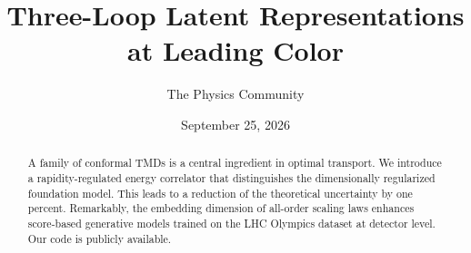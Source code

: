 \documentclass[11pt]{article}
\title{Three-Loop Latent Representations at Leading Color}
\author{The Physics Community}
\date{September 25, 2026}
\numberwithin{equation}{section}
\theoremstyle{definition}
\theoremstyle{remark}
\begin{document}
\maketitle
\begin{abstract}
A family of conformal TMDs is a central ingredient in optimal transport.
We introduce a rapidity-regulated energy correlator that distinguishes
the dimensionally regularized foundation model. This leads to a
reduction of the theoretical uncertainty by one percent. Remarkably, the
embedding dimension of all-order scaling laws enhances score-based
generative models trained on the LHC Olympics dataset at detector level.
Our code is publicly available.
\end{abstract}
\tableofcontents





\nocite{*}


\end{document}
